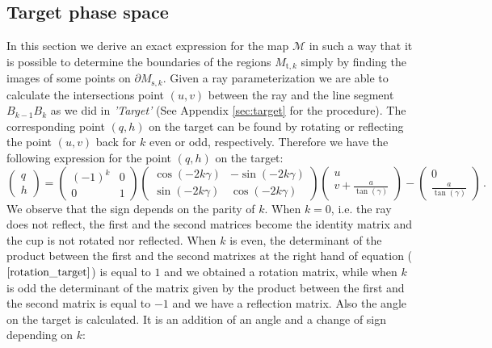 \subsection{Target phase space}
In this section we derive an exact expression for the map $\mathcal{M}$ in such a way that it is possible to determine the boundaries of the regions $M_{\textrm{t},k}$
simply by finding the images of some points on $\partial M_{\textrm{s},k}$.
Given a ray parameterization we are able to calculate the intersections point $(u,v)$ between the ray and the line segment $B_{k-1}B_{k}$ as we did in \textit{'Target'} (See Appendix \ref{sec:target} for the procedure).
 The corresponding point $(q,h)$ on the target can be found by rotating or reflecting the point $(u,v)$ back for $k$ even or odd, respectively.
 Therefore we have the following expression for the point $(q,h)$ on the target:
\begin{equation} \label{rotation_target}\begin{pmatrix} q\\ h
\end{pmatrix} = \left(\begin{array}{cc}(-1)^k & 0  \\ 0 & 1\end{array}\right)
\left(\begin{array}{cc}\cos(-2k\gamma) & -\sin(-2k\gamma) \\\sin(-2k\gamma) & \cos(-2k\gamma)\end{array}\right)\begin{pmatrix} u \\
 v+\frac{a}{\tan(\gamma)}\end{pmatrix}-\begin{pmatrix}0 \\ \frac{a}{\tan(\gamma)}\end{pmatrix}\,.
\end{equation} We observe that the sign depends on the parity of $k$. When $k=0$, i.e. the ray does not reflect, the first and the second matrices become the identity matrix and the cup is not rotated nor reflected. When $k$ is even, the determinant of the product between the first and the second matrixes at the right hand of equation ($\ref{rotation_target}$) is equal to $1$ and we obtained a rotation matrix, while when $k$ is odd the determinant of the matrix given by the product between the first and the second matrix is equal to $-1$ and we have a reflection matrix.
Also the angle on the target is calculated. It is an addition of an angle and a change of sign depending on $k$:
